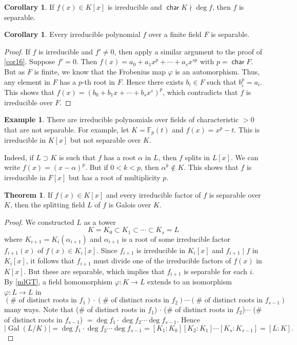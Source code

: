 \documentclass[10pt,letterpaper,cm]{nupset}
\theoremstyle{definition}
\newtheorem{exmp}[definition]{Example}
\theoremstyle{theorem}
\newtheorem{theorem}[definition]{Theorem}
\newtheorem{corollary}[definition]{Corollary}
\theoremstyle{remark}
\newcommand{\F}{\mathbb F}
\newcommand{\1}{\mathbf{1}}
\newcommand{\0}{\vec 0}
\DeclareMathOperator{\Char}{\mathsf{char}}
\DeclareMathOperator{\gal}{Gal}
\begin{document}
\begin{corollary}
If $f(x) \in K[x]$ is irreducible and $\Char{K} \nmid \deg{f}$, then $f$ is separable. 
\end{corollary}

\begin{corollary}
Every irreducible polynomial $f$ over a finite field $F$ is separable. 
\end{corollary}
\begin{proof}
If $f$ is irreducible and $f' \ne 0$, then apply a similar argument to the proof of \cref{cor16}. Suppose $f'=0$. Then $f(x) = a_0 + a_1x^p + \cdots + a_sx^{sp}$ with $p= \Char{F}$. But as $F$ is finite, we know that the Frobenius map $\varphi$ is an automorphism. Thus, any element in $F$ has a $p$-th root in $F$. Hence there exists $b_i \in F$ such that $b_i^p = a_i$. This shows that $f(x) = (b_0 + b_1x + \cdots + b_sx^s)^p$, which contradicts that $f$ is irreducible over $F$.
\end{proof}

\begin{exmp}
There are irreducible polynomials over fields of characteristic $>0$ that are not separable. For example, let $K = \F_p(t)$ and $f(x) = x^p-t$. This is irreducible in $K[x]$ but not separable over $K$.

Indeed,  if $L \supset K$ is such that $f$ has a root $\alpha$ in $L$, then $f$ splits in $L[x]$. We can write $f(x) = (x-\alpha)^p$. But if $0 <k < p$, then $\alpha^k \notin K$. This shows that $f$ is irreducible in $F[x]$ but has a root of multiplicity $p$.
\end{exmp}


\begin{theorem}
If $f(x) \in K[x]$ and every irreducible factor of $f$ is separable over $K$, then the splitting field $L$ of $f$ is Galois over $K$.
\end{theorem}
\begin{proof}
We constructed $L$ as a tower $$K = K_0 \subset K_1 \subset \cdots \subset K_s = L$$ where $K_{i+1} = K_i(\alpha_{i+1})$ and $\alpha_{i+1}$  is a root of some irreducible factor $f_{i+1}(x)$ of $f(x)\in K_i[x]$. Since $f_{i+1}$ is irreducible in $K_i[x]$ and $f_{i+1} \mid f $ in $K_i[x]$, it follows that $f_{i+1}$ must divide one of the irreducible factors of $f(x)$ in $K[x]$. But these are separable, which implies that $f_{i+1}$ is separable for each $i$. By \cref{mlGT}, a field homomorphism $\varphi : K \to L$ extends to an isomorphism $\varphi : L \to L$ in $$\left(\# \text{ of distinct roots in } f_1\right) \cdot \left(\# \text{ of distinct roots in }f_2\right)\cdots \left(\# \text{ of distinct roots in }f_{s-1}\right)$$ many ways. Note that (\# of distinct roots in $f_1$) $\cdot$ (\# of distinct roots in $f_2$)$\cdots$ (\# of distinct roots in $f_{s-1}$) $= \deg{f_1}\cdot \deg{f_2} \cdots \deg{f_{s-1}}$. Hence $$\left\lvert{\gal(L/K)}\right\rvert = \deg{f_1}\cdot \deg{f_2} \cdots \deg{f_{s-1}} = [K_1: K_0][K_2: K_1] \cdots [K_s: K_{s-1}] = [L:K].$$
\end{proof}
\end{document}
